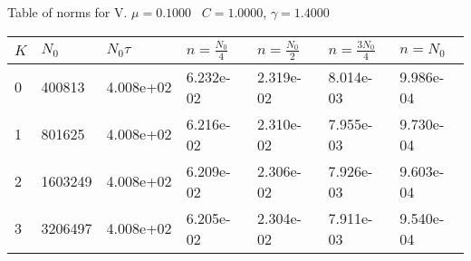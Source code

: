 \begin{center}
Table of norms for V. $\mu = 0.1000$ \, $C = 1.0000$, $\gamma = 1.4000$
  
\begin{tabular}{|p{0.8in}|p{0.8in}|p{0.8in}|p{0.8in}|p{0.8in}|p{0.8in}|p{0.8in}|} \hline
$K$ &$N_0$ &$N_0 \tau$ &$n = \frac{N_0}{4}$ &$n = \frac{N_0}{2}$ &$n = \frac{3N_0}{4}$ &$n = N_0$ \\ \hline 
0 &400813 &4.008e+02 &6.232e-02 &2.319e-02 &8.014e-03 &9.986e-04 \\ \hline 
1 &801625 &4.008e+02 &6.216e-02 &2.310e-02 &7.955e-03 &9.730e-04 \\ \hline 
2 &1603249 &4.008e+02 &6.209e-02 &2.306e-02 &7.926e-03 &9.603e-04 \\ \hline 
3 &3206497 &4.008e+02 &6.205e-02 &2.304e-02 &7.911e-03 &9.540e-04 \\ \hline 

\end{tabular}\\[20pt]
\end{center}
